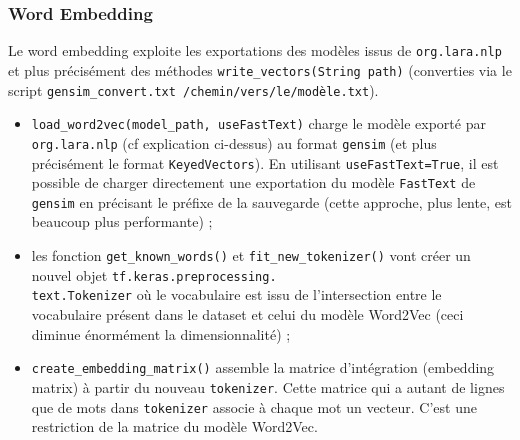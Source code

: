 \documentclass[10pt,a4paper]{article}
\begin{document}
\subsubsection{Word Embedding}
Le word embedding exploite les exportations des modèles issus de \texttt{org.lara.nlp} et plus précisément des méthodes \texttt{write\_vectors(String path)} (converties via le script \texttt{gensim\_convert.txt /chemin/vers/le/modèle.txt}).
\begin{itemize}
	\item \texttt{load\_word2vec(model\_path, useFastText)} charge le modèle exporté par \texttt{org.lara.nlp} (cf explication ci-dessus) au format \texttt{gensim} (et plus précisément le format \texttt{KeyedVectors}). En utilisant \texttt{useFastText=True}, il est possible de charger directement une exportation du modèle \texttt{FastText} de \texttt{gensim} en précisant le préfixe de la sauvegarde (cette approche, plus lente, est beaucoup plus performante) ;
	\item les fonction \texttt{get\_known\_words()} et \texttt{fit\_new\_tokenizer()} vont créer un nouvel objet \texttt{tf.keras.preprocessing.\\text.Tokenizer} où le vocabulaire est issu de l'intersection entre le vocabulaire présent dans le dataset et celui du modèle Word2Vec (ceci diminue énormément la dimensionnalité) ;
	\item \texttt{create\_embedding\_matrix()} assemble la matrice d'intégration (embedding matrix) à partir du nouveau \texttt{tokenizer}. Cette matrice qui a autant de lignes que de mots dans \texttt{tokenizer} associe à chaque mot un vecteur. C'est une restriction de la matrice du modèle Word2Vec.
\end{itemize}
\end{document}
